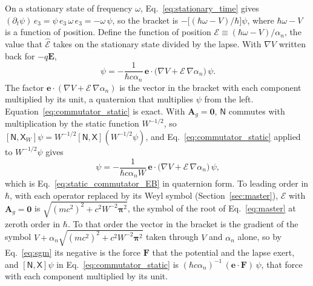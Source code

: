 \documentclass[aps,prd,onecolumn,tightenlines,nofootinbib,notitlepage,11pt,floatfix]{revtex4-2}
\theoremstyle{indentedtheorem}
\begin{document}
On a stationary state of frequency $\omega$, Eq.~\eqref{eq:stationary_time} gives $(\partial_t\psi) \, e_3=\psi \, e_3 \, \omega \, e_3=-\omega\,\psi$, so the bracket is $-\big[(\hbar\omega-V)/\hbar\big]\psi$, where $\hbar\omega-V$ is a function of position. Define the function of position $\mathcal{E}\equiv(\hbar\omega-V)/\alpha_n$, the value that $\hat{\mathcal{E}}$ takes on the stationary state divided by the lapse. With $\nabla V$ written back for $-q\mathbf{E}$,
\begin{equation}
    [\mathsf{N},\mathsf{X}] \, \psi = -\frac{1}{\hbar c\alpha_n} \, \mathbf{e}\cdot\big(\nabla V + \mathcal{E} \, \nabla\alpha_n\big) \, \psi .
    \label{eq:commutator_static}
\end{equation}
The factor $\mathbf{e}\cdot(\nabla V+\mathcal{E}\,\nabla\alpha_n)$ is the vector in the bracket with each component multiplied by its unit, a quaternion that multiplies $\psi$ from the left. Equation~\eqref{eq:commutator_static} is exact. With $\mathbf{A}_g=\mathbf{0}$, $\mathsf{N}$ commutes with multiplication by the static function $W^{-1/2}$, so $[\mathsf{N},\mathsf{X}_W]\psi = W^{-1/2}[\mathsf{N},\mathsf{X}](W^{-1/2}\psi)$, and Eq.~\eqref{eq:commutator_static} applied to $W^{-1/2}\psi$ gives
\begin{equation*}
    [\mathsf{N},\mathsf{X}_W] \, \psi = -\frac{1}{\hbar c\alpha_nW} \, \mathbf{e}\cdot\big(\nabla V + \mathcal{E} \, \nabla\alpha_n\big) \, \psi ,
\end{equation*}
which is Eq.~\eqref{eq:static_commutator_EB} in quaternion form. To leading order in $\hbar$, with each operator replaced by its Weyl symbol (Section~\ref{sec:master}), $\mathcal{E}$ with $\mathbf{A}_g=\mathbf{0}$ is $\sqrt{(mc^2)^2+c^2W^{-2}\boldsymbol{\pi}^2}$, the symbol of the root of Eq.~\eqref{eq:master} at zeroth order in $\hbar$. To that order the vector in the bracket is the gradient of the symbol $V+\alpha_n\sqrt{(mc^2)^2+c^2W^{-2}\boldsymbol{\pi}^2}$ taken through $V$ and $\alpha_n$ alone, so by Eq.~\eqref{eq:sgm} its negative is the force $\mathbf{F}$ that the potential and the lapse exert, and $[\mathsf{N},\mathsf{X}]\psi$ in Eq.~\eqref{eq:commutator_static} is $(\hbar c\alpha_n)^{-1} \, (\mathbf{e}\cdot\mathbf{F}) \, \psi$, that force with each component multiplied by its unit.
\end{document}
